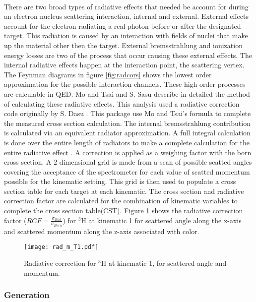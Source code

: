 \paragraph{}There are two broad types of radiative effects that needed be account for during an electron nucleus scattering interaction, internal and external. External effects account for the electron radiating a real photon before or after the designated target. This radiation is caused by an interaction with fields of nuclei that make up the material other then the target. External bremsstrahlung and ionization energy losses are two of the process that occur causing these external effects. The internal radiative effects happen at the interaction point, the scattering vertex. The Feynman diagrams in figure \ref{fig:radcors} shows the lowest order approximation for the possible interaction channels. These high order processes are calculable in QED. Mo and Tsai \cite{radcors2} and S. Sasu \cite{radcors} describe in detailed the method of calculating these radiative effects. This analysis used a radiative correction code originally by S. Dasu \cite{radcors}. This package use Mo and Tsai's formula to complete the measured cross section calculation.  The internal bremsstrahlung contribution is calculated via an equivalent radiator approximation. A full integral calculation is done over the entire length of radiators to make a complete calculation for the entire radiative effect  \cite{Ajth,radcors,radcors2,seelyth}. A correction is applied as a weighing factor with the born cross section. A 2 dimensional grid is made from a scan of possible scatted angles covering the acceptance of the spectrometer for each value of scatted momentum possible for the kinematic setting. This grid is then used to populate a cross section table for each target at each kinematic. The cross section and radiative correction factor are calculated for the combination of kinematic variables to complete the cross section table(CST). Figure \ref{RCF} shows the radiative correction factor ($RCF=\frac{\sigma_{Rad}}{\sigma_{Born}}$) for $^3$H at kinematic 1 for scattered angle along the x-axis and scattered momentum along the z-axis associated with color.  
\begin{figure}
	\caption{Radiative correction for $^3$H at kinematic 1, for scattered angle and momentum.\label{RCF}}
	\texttt{[image: rad\_m\_T1.pdf]}
\end{figure}

\subsubsection{Generation}
